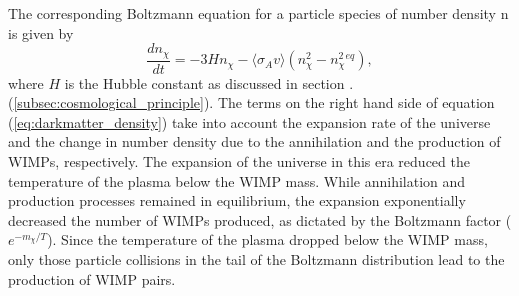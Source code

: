 The corresponding Boltzmann equation for a particle species of number density n is given by \cite{Bertone_2005}
%
\begin{equation} \label{eq:darkmatter_density}
    \frac{dn_{\chi}}{dt} = -3Hn_{\chi} - \langle \sigma_{A}v \rangle (n_{\chi}^2 - n^2_{\chi}^{eq}), 
\end{equation}
%
where $H$ is the Hubble constant as discussed in section . (\ref{subsec:cosmological_principle}). The terms on the right hand side of equation (\ref{eq:darkmatter_density}) take into account the expansion rate of the universe and the change in number density due to the annihilation and the production of WIMPs, respectively. The expansion of the universe in this era reduced the temperature of the plasma below the WIMP mass. While annihilation and production processes remained in equilibrium, the expansion exponentially decreased the number of WIMPs produced, as dictated by the Boltzmann factor ($e^{-m_{\chi}/T}$). Since the temperature of the plasma dropped below the WIMP mass, only those particle collisions in the tail of the Boltzmann distribution lead to the production of WIMP pairs. 

